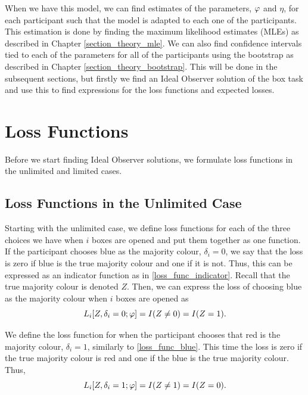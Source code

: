 When we have this model, we can find estimates of the parameters, $\varphi$ and $\eta$, for each participant such that the model is adapted to each one of the participants. This estimation is done by finding the maximum likelihood estimates (MLEs) as described in Chapter \ref{section_theory_mle}. 
We can also find confidence intervals tied to each of the parameters for all of the participants using the bootstrap as described in Chapter \ref{section_theory_bootstrap}. This will be done in the subsequent sections, but firstly we find an Ideal Observer solution of the box task and use this to find expressions for the loss functions and expected losses. 




\section{Loss Functions}
Before we start finding Ideal Observer solutions, we formulate loss functions in the unlimited and limited cases. 

\subsection{Loss Functions in the Unlimited Case}
Starting with the unlimited case, we define loss functions for each of the three choices we have when $i$ boxes are opened and put them together as one function. If the participant chooses blue as the majority colour, $\delta_i=0$, we say that the loss is zero if blue is the true majority colour and one if it is not. Thus, this can be expressed as an indicator function as in \eqref{loss_func_indicator}. Recall that the true majority colour is denoted $Z$. Then, we can express the loss of choosing blue as the majority colour when $i$ boxes are opened as
\begin{equation}
\label{loss_func_blue}
    L_i[Z,\delta_i=0;\varphi] = I(Z\neq0) = I(Z=1).
\end{equation}

We define the loss function for when the participant chooses that red is the majority colour, $\delta_i=1$, similarly to \eqref{loss_func_blue}. This time the loss is zero if the true majority colour is red and one if the blue is the true majority colour. Thus,
\begin{equation}
\label{loss_func_red}
    L_i[Z,\delta_i=1;\varphi] = I(Z\neq1)=I(Z=0).
\end{equation}

